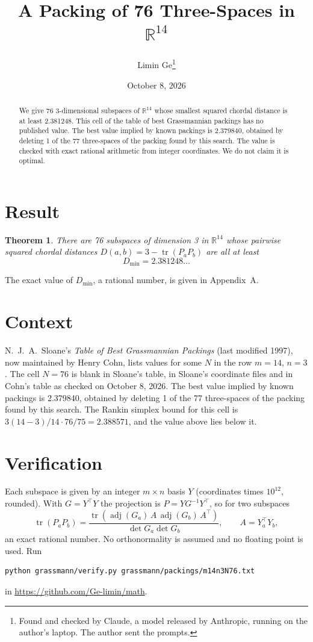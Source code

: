 \documentclass[11pt,a4paper]{article}
\title{A Packing of 76 Three-Spaces in $\mathbb{R}^{14}$}
\author{Limin Ge\thanks{Found and checked by Claude, a model released by Anthropic, running on the author's laptop. The author sent the prompts.}}
\date{October 8, 2026}
\newtheorem*{theorem}{Theorem}
\begin{document}
\maketitle
\begin{abstract}
We give 76 3-dimensional subspaces of $\mathbb{R}^{14}$ whose smallest squared chordal distance is at least 2.381248. This cell of the table of best Grassmannian packings has no published value. The best value implied by known packings is 2.379840, obtained by deleting 1 of the 77 three-spaces of the packing found by this search. The value is checked with exact rational arithmetic from integer coordinates. We do not claim it is optimal.
\end{abstract}

\section{Result}
\begin{theorem}
There are 76 subspaces of dimension 3 in $\mathbb{R}^{14}$ whose pairwise squared chordal distances $D(a,b) = 3 - \operatorname{tr}(P_aP_b)$ are all at least
\[ D_{\min} = 2.381248\ldots \]
\end{theorem}
The exact value of $D_{\min}$, a rational number, is given in Appendix~A.


\section{Context}
N.~J.~A.~Sloane's \emph{Table of Best Grassmannian Packings} (last modified 1997), now maintained by Henry Cohn, lists values for some $N$ in the row $m=14$, $n=3$. The cell $N=76$ is blank in Sloane's table, in Sloane's coordinate files and in Cohn's table as checked on October 8, 2026. The best value implied by known packings is 2.379840, obtained by deleting 1 of the 77 three-spaces of the packing found by this search. The Rankin simplex bound for this cell is $3(14-3)/14\cdot 76/75 = 2.388571$, and the value above lies below it.


\section{Verification}
Each subspace is given by an integer $m\times n$ basis $Y$ (coordinates times $10^{12}$, rounded). With $G=Y^\top Y$ the projection is $P=YG^{-1}Y^\top$, so for two subspaces
\[ \operatorname{tr}(P_aP_b)=\frac{\operatorname{tr}(\operatorname{adj}(G_a)\,A\,\operatorname{adj}(G_b)\,A^\top)}{\det G_a\det G_b},\qquad A=Y_a^\top Y_b, \]
an exact rational number. No orthonormality is assumed and no floating point is used. Run
\begin{verbatim}
python grassmann/verify.py grassmann/packings/m14n3N76.txt
\end{verbatim}
in \url{https://github.com/Ge-limin/math}.
\end{document}
